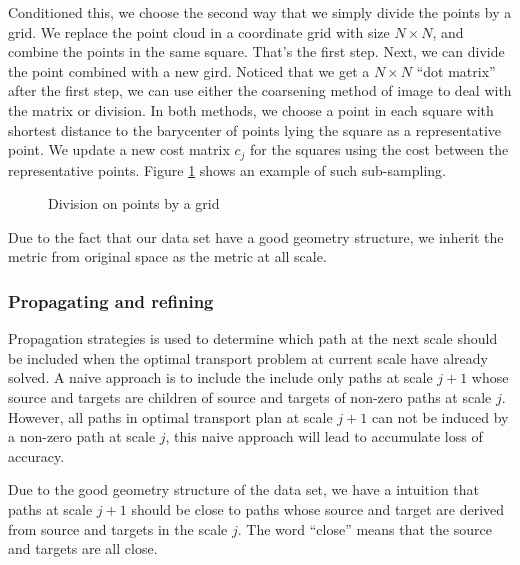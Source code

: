 \documentclass[english]{pkupaper}
\begin{document}
Conditioned this, we choose the second way that we simply divide the points by a grid. We replace the point cloud in a coordinate grid with size $N\times N$, and combine the points in the same square. That's the first step. Next, we can divide the point combined with a new gird. Noticed that we get a $N\times N$ ``dot matrix'' after the first step, we can use either the coarsening method of image to deal with the matrix or division. In both methods, we choose a point in each square with shortest distance to the barycenter of points lying the square as a representative point. We update a new cost matrix $c_j$ for the squares using the cost between the representative points. Figure \ref{Fig:Div} shows an example of such sub-sampling.

\begin{figure}
\centering
\scalebox{0.4}{}
\scalebox{0.4}{}  
\caption{Division on points by a grid} \label{Fig:Div}
\end{figure}

Due to the fact that our data set have a good geometry structure, we inherit the metric from original space as the metric at all scale.

\subsubsection{Propagating and refining}

Propagation strategies is used to determine which path at the next scale should be included when the optimal transport problem at current scale have already solved. A naive approach is to include the include only paths at scale $j+1$ whose source and targets are children of source and targets of non-zero paths at scale $j$. However, all paths in optimal transport plan at scale $j+1$ can not be induced by a non-zero path at scale $j$, this naive approach will lead to accumulate loss of accuracy.

Due to the good geometry structure of the data set, we have a intuition that paths at scale $j+1$ should be close to paths whose source and target are derived from source and targets in the scale $j$. The word ``close'' means that the source and targets are all close.
\end{document}
